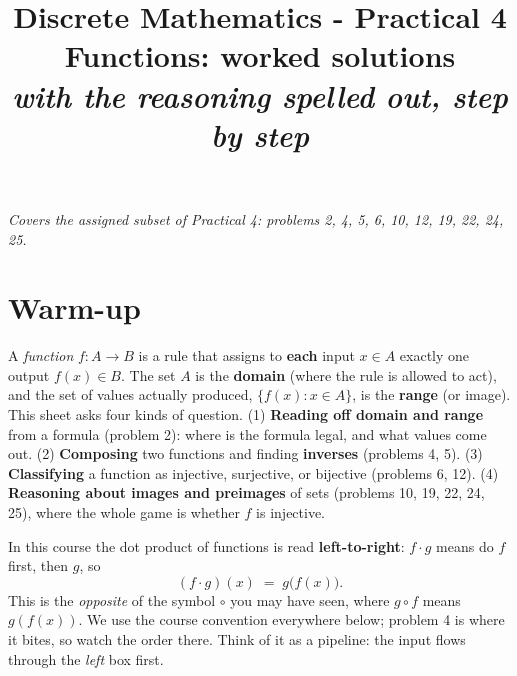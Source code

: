 \documentclass[11pt,a4paper]{article}
\title{\vspace{-1.2cm}\textbf{Discrete Mathematics - Practical 4}\\[2pt]
\large Functions: worked solutions\\[2pt]
\normalsize\itshape with the reasoning spelled out, step by step}
\author{}
\date{}
\begin{document}
\maketitle
\vspace{-1.0cm}

\begin{center}\small\itshape Covers the assigned subset of Practical 4: problems 2, 4, 5, 6, 10, 12, 19, 22, 24, 25.\end{center}

\section*{Warm-up}

A \emph{function} $f:A\to B$ is a rule that assigns to \textbf{each} input $x\in A$ exactly one
output $f(x)\in B$. The set $A$ is the \textbf{domain} (where the rule is allowed to act), and the
set of values actually produced, $\{f(x):x\in A\}$, is the \textbf{range} (or image). This sheet
asks four kinds of question. (1) \textbf{Reading off domain and range} from a formula (problem 2):
where is the formula legal, and what values come out. (2) \textbf{Composing} two functions and
finding \textbf{inverses} (problems 4, 5). (3) \textbf{Classifying} a function as injective,
surjective, or bijective (problems 6, 12). (4) \textbf{Reasoning about images and preimages} of
sets (problems 10, 19, 22, 24, 25), where the whole game is whether $f$ is injective.

\begin{tcolorbox}[colback=armRed!6,colframe=armRed!70!black,boxrule=0.8pt,arc=2mm,
  title={\bfseries One convention to fix before anything else: composition is left-to-right},
  fonttitle=\bfseries\color{white},coltitle=white]
In this course the dot product of functions is read \textbf{left-to-right}: $f\cdot g$ means
\textquotedbl{}do $f$ first, then $g$\textquotedbl{}, so
\[
  (f\cdot g)(x) \;=\; g\bigl(f(x)\bigr).
\]
This is the \emph{opposite} of the symbol $\circ$ you may have seen, where $g\circ f$ means
$g(f(x))$. We use the course convention everywhere below; problem 4 is where it bites, so watch
the order there. Think of it as a pipeline: the input flows through the \emph{left} box first.
\end{tcolorbox}

\begin{center}
\end{center}
\end{document}
